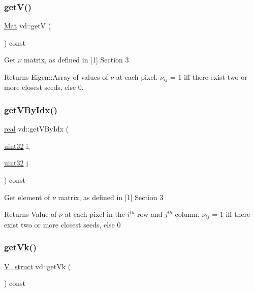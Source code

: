 \subsubsection{\texorpdfstring{get\+V()}{getV()}}
{\footnotesize\ttfamily \mbox{\hyperlink{typedefs_8cpp_a9fa28c1f74e909474857584f5c7b0088}{Mat}} vd\+::getV (\begin{DoxyParamCaption}{ }\end{DoxyParamCaption}) const}

Get $\nu$ matrix, as defined in \mbox{[}1\mbox{]} Section 3 \begin{DoxyReturn}{Returns}
Eigen\+::\+Array of values of $\nu$ at each pixel. $\nu_{ij}$ = 1 iff there exist two or more closest seeds, else 0. 
\end{DoxyReturn}
\mbox{\label{classvd_a640ed20e4618abd409e180a707eea3b1}} 
\subsubsection{\texorpdfstring{get\+V\+By\+Idx()}{getVByIdx()}}
{\footnotesize\ttfamily \mbox{\hyperlink{typedefs_8cpp_a58a0c7cf2501f4492da833421be92547}{real}} vd\+::get\+V\+By\+Idx (\begin{DoxyParamCaption}\item[{\mbox{\hyperlink{typedefs_8cpp_a8ad23e2333787a214e20a58a284a5a60}{uint32}}}]{i,  }\item[{\mbox{\hyperlink{typedefs_8cpp_a8ad23e2333787a214e20a58a284a5a60}{uint32}}}]{j }\end{DoxyParamCaption}) const}

Get element of $\nu$ matrix, as defined in \mbox{[}1\mbox{]} Section 3 \begin{DoxyReturn}{Returns}
Value of $\nu$ at each pixel in the $ i^{th} $ row and $ j^{th} $ column. $\nu_{ij}$ = 1 iff there exist two or more closest seeds, else 0 
\end{DoxyReturn}
\mbox{\label{classvd_a090bebdbbff36888934c870daf3dcb36}} 
\subsubsection{\texorpdfstring{get\+Vk()}{getVk()}}
{\footnotesize\ttfamily \mbox{\hyperlink{structV__struct}{V\+\_\+struct}} vd\+::get\+Vk (\begin{DoxyParamCaption}{ }\end{DoxyParamCaption}) const}

